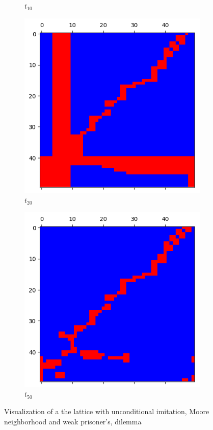 \documentclass[letterpaper]{article}
\begin{document}
\begin{figure}[H]
\begin{subfigure}{.33\textwidth}
      \caption{$t_{10}$}
      \label{fig:t10_50part1}
    \end{subfigure}
    \begin{subfigure}{.33\textwidth}
      \centering
      \includegraphics[width=1\linewidth]{images/assign2/visu_50-part1/t20}
      \caption{$t_{20}$}
      \label{fig:t20_50part1}
    \end{subfigure}
    \begin{subfigure}{.33\textwidth}
      \centering
      \includegraphics[width=1\linewidth]{images/assign2/visu_50-part1/t50}
      \caption{$t_{50}$}
      \label{fig:t50_50part1}
    \end{subfigure}
    \caption{Visualization of a the lattice with unconditional imitation,
    Moore neighborhood and weak prisoner's, dilemma}
    \label{fig:visu50part1}
\end{figure}
\end{document}
